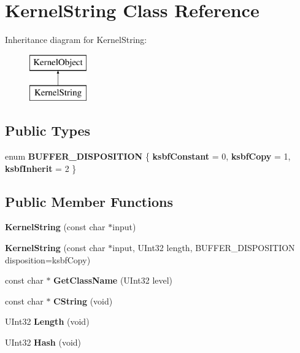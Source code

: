 \hypertarget{class_kernel_string}{}\section{Kernel\+String Class Reference}
\label{class_kernel_string}
Inheritance diagram for Kernel\+String\+:\begin{figure}[H]
\begin{center}
\leavevmode
\includegraphics[height=2.000000cm]{class_kernel_string}
\end{center}
\end{figure}
\subsection*{Public Types}
\begin{DoxyCompactItemize}
\item 
\mbox{\label{class_kernel_string_a58274876ad6c9e4a76630ef4e3d3561c}} 
enum {\bfseries B\+U\+F\+F\+E\+R\+\_\+\+D\+I\+S\+P\+O\+S\+I\+T\+I\+ON} \{ {\bfseries ksbf\+Constant} = 0, 
{\bfseries ksbf\+Copy} = 1, 
{\bfseries ksbf\+Inherit} = 2
 \}
\end{DoxyCompactItemize}
\subsection*{Public Member Functions}
\begin{DoxyCompactItemize}
\item 
\mbox{\label{class_kernel_string_af1993dc2645feb180e9007b2f3043590}} 
{\bfseries Kernel\+String} (const char $\ast$input)
\item 
\mbox{\label{class_kernel_string_a869af80f41d0fab7af5178efa9a9ce5e}} 
{\bfseries Kernel\+String} (const char $\ast$input, U\+Int32 length, B\+U\+F\+F\+E\+R\+\_\+\+D\+I\+S\+P\+O\+S\+I\+T\+I\+ON disposition=ksbf\+Copy)
\item 
\mbox{\label{class_kernel_string_aae7fa539b2a831bab547b3a9b790c853}} 
const char $\ast$ {\bfseries Get\+Class\+Name} (U\+Int32 level)
\item 
\mbox{\label{class_kernel_string_a89adc7b7b3d8d681dad2440be449f44d}} 
const char $\ast$ {\bfseries C\+String} (void)
\item 
\mbox{\label{class_kernel_string_abd900bb2e758c23d833bfa8b79d04dc8}} 
U\+Int32 {\bfseries Length} (void)
\item 
\mbox{\label{class_kernel_string_adcb0c39f668a93ecdf5da357f5b0547d}} 
U\+Int32 {\bfseries Hash} (void)
\end{DoxyCompactItemize}
